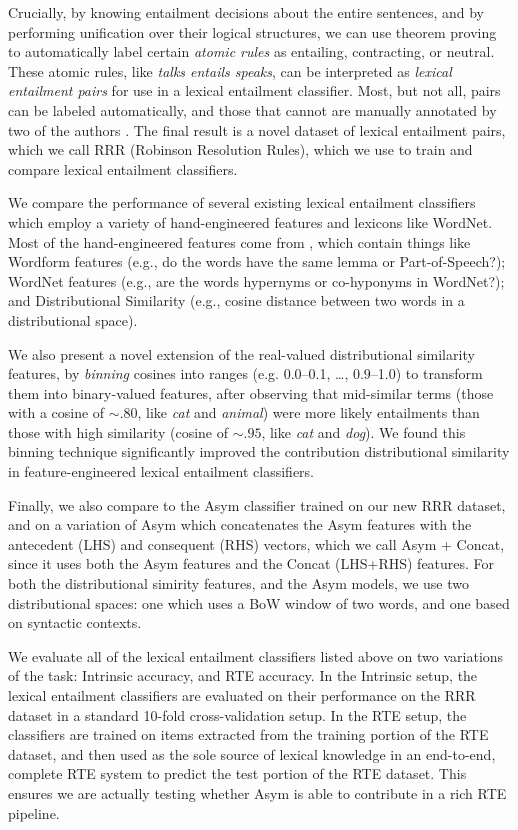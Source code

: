 \documentclass[12pt]{article}
\begin{document}
Crucially, by knowing entailment decisions about the
entire sentences, and by performing unification over their logical structures,
we can use theorem proving to automatically label certain {\em atomic rules} as
entailing, contracting, or neutral. These atomic rules, like {\em talks entails speaks}, can
be interpreted as {\em lexical entailment pairs} for use in a lexical entailment
classifier. Most, but not all, pairs can be labeled automatically, and those
that cannot are manually annotated by two of the authors \cite{beltagy:2016:cl}.
The final result is a novel dataset of lexical entailment pairs, which we call
RRR (Robinson Resolution Rules), which we use to train and compare lexical
entailment classifiers.

We compare the performance of several existing lexical entailment
classifiers which employ a variety of hand-engineered features and lexicons
like WordNet.  Most of the hand-engineered features come from
, which contain things like Wordform features (e.g.,
do the words have the same lemma or Part-of-Speech?); WordNet features (e.g.,
are the words hypernyms or co-hyponyms in WordNet?); and Distributional
Similarity (e.g., cosine distance between two words in a distributional space).

We also present a novel extension of the real-valued distributional similarity
features, by {\em binning} cosines into ranges (e.g. 0.0--0.1, \ldots, 0.9--1.0)
to transform them into binary-valued features, after observing that
mid-similar terms (those with a cosine of $\sim.80$, like {\em cat} and {\em
animal}) were more likely entailments than those with high similarity
(cosine of $\sim.95$, like {\em cat} and {\em dog}). We found this binning
technique significantly improved the contribution distributional similarity
in feature-engineered lexical entailment classifiers.

Finally, we also compare to the Asym classifier trained on our new RRR dataset,
and on a variation of Asym which concatenates the Asym features with the
antecedent (LHS) and consequent (RHS) vectors, which we call Asym + Concat,
since it uses both the Asym features and the Concat (LHS+RHS) features. For
both the distributional simirity features, and the Asym models, we use two
distributional spaces: one which uses a BoW window of two words, and one based
on syntactic contexts.

We evaluate all of the lexical entailment classifiers listed above on two
variations of the task: Intrinsic accuracy, and RTE accuracy. In the Intrinsic
setup, the lexical entailment classifiers are evaluated on their performance on
the RRR dataset in a standard 10-fold cross-validation setup. In the RTE setup,
the classifiers are trained on items extracted from the training portion of the
RTE dataset, and then used as the sole source of lexical knowledge in an
end-to-end, complete RTE system 
to predict the test portion of the RTE dataset. This ensures we are actually
testing whether Asym is able to contribute in a rich RTE pipeline.
\end{document}
